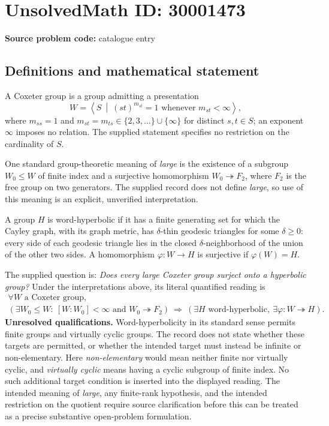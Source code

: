 \documentclass[11pt]{article}
\begin{document}
\section*{UnsolvedMath ID: 30001473}
\textbf{Source problem code:} catalogue entry
\subsection{Definitions and mathematical statement}
A Coxeter group is a group admitting a presentation
\[
W=\left\langle S\ \middle|\ (st)^{m_{st}}=1\text{ whenever }m_{st}<\infty\right\rangle,
\]
where \(m_{ss}=1\) and \(m_{st}=m_{ts}\in\{2,3,\ldots\}\cup\{\infty\}\) for distinct \(s,t\in S\); an exponent \(\infty\) imposes no relation. The supplied statement specifies no restriction on the cardinality of \(S\).

One standard group-theoretic meaning of \emph{large} is the existence of a subgroup \(W_0\leq W\) of finite index and a surjective homomorphism \(W_0\twoheadrightarrow F_2\), where \(F_2\) is the free group on two generators. The supplied record does not define \emph{large}, so use of this meaning is an explicit, unverified interpretation.

A group \(H\) is word-hyperbolic if it has a finite generating set for which the Cayley graph, with its graph metric, has \(\delta\)-thin geodesic triangles for some \(\delta\geq0\): every side of each geodesic triangle lies in the closed \(\delta\)-neighborhood of the union of the other two sides. A homomorphism \(\varphi:W\to H\) is surjective if \(\varphi(W)=H\).

The supplied question is: \emph{Does every large Coxeter group surject onto a hyperbolic group?} Under the interpretations above, its literal quantified reading is
\[
\begin{gathered}
\forall W\text{ a Coxeter group},\\
\left(\exists W_0\leq W:\ [W:W_0]<\infty\text{ and }W_0\twoheadrightarrow F_2\right)
\ \Longrightarrow\ 
\left(\exists H\text{ word-hyperbolic},\ \exists\varphi:W\twoheadrightarrow H\right).
\end{gathered}
\]
\textbf{Unresolved qualifications.} Word-hyperbolicity in its standard sense permits finite groups and virtually cyclic groups. The record does not state whether these targets are permitted, or whether the intended target must instead be infinite or non-elementary. Here \emph{non-elementary} would mean neither finite nor virtually cyclic, and \emph{virtually cyclic} means having a cyclic subgroup of finite index. No such additional target condition is inserted into the displayed reading. The intended meaning of \emph{large}, any finite-rank hypothesis, and the intended restriction on the quotient require source clarification before this can be treated as a precise substantive open-problem formulation.
\end{document}

